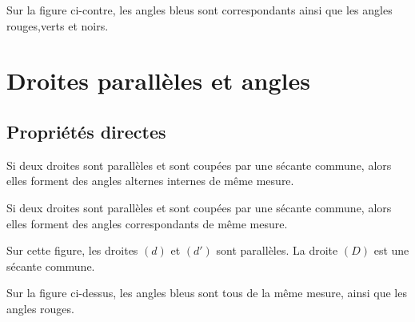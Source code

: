 \documentclass[a4paper,10pt]{report}
\begin{document}
\vspace{-8mm}
\begin{ex}
Sur la figure ci-contre, les angles bleus sont correspondants ainsi que les angles rouges,verts et noirs.
\end{ex}

\vspace{-3mm}
\section{Droites parallèles et angles}

\vspace{-2mm}
\subsection{Propriétés directes}

\vspace{-10mm}
\noindent \begin{minipage}{10cm}
\begin{prop}
Si deux droites sont parallèles et sont coupées par une sécante commune, alors elles
forment des angles alternes internes de même mesure.
\end{prop}

\begin{prop}
Si deux droites sont parallèles et sont coupées par une sécante commune, alors elles
forment des angles correspondants de même mesure.
\end{prop}
\end{minipage}
\hspace{2mm}
\begin{minipage}{7cm}
\begin{center}
\end{center}
\end{minipage}

\vspace{-8mm}
\begin{ex}
Sur cette figure, les droites $(d)$ et $(d')$ sont parallèles. La droite $(D)$ est une sécante commune.

\noindent Sur la figure ci-dessus, les angles bleus sont tous de la même mesure, ainsi que les angles rouges.
\end{ex}
\end{document}
